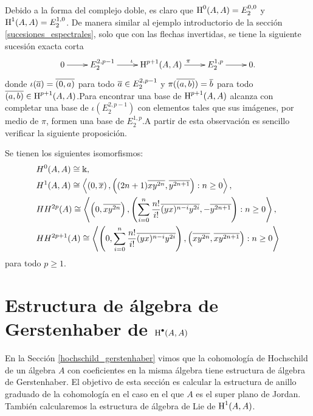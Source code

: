 \documentclass[fleqn,../tesis.tex]{subfiles}
\begin{document}
Debido a la forma del complejo doble, es claro que $\operatorname{H}^{0}(A, A) = E^{0, 0}_{2}$ y $\operatorname{H}^{1}(A, A) = E^{1, 0}_{2}$. De manera
similar al ejemplo introductorio de la sección \ref{sucesiones_espectrales}, solo que con las flechas invertidas, se tiene la siguiente
sucesión exacta corta
\begin{align*}
\xymatrix{
    0 \ar[r] & E^{2, p - 1}_{2} \ar[r]^{\iota} & \Hy^{p + 1}(A, A) \ar[r]^{\pi} & E^{1, p}_2 \ar[r] & 0.
}
\end{align*}
donde $\iota(\overline{a}) = \overline{(0, a)}$ para todo $\overline{a} \in E^{2, p - 1}_{2}$ y $\pi(\overline{(a, b)}) = \overline{b}$ para todo
$\overline{(a, b)} \in \operatorname{H}^{p + 1}(A, A)$.Para encontrar una
base de $\operatorname{H}^{p + 1}(A, A)$ alcanza con completar una base de $\iota\left(E^{2, p - 1}_{2}\right)$ con elementos
tales que sus imágenes, por medio de $\pi$, formen una base de $E^{1, p}_{2}$.A partir
de esta observación es sencillo verificar la siguiente proposición.
\begin{prop}
    Se tienen los siguientes isomorfismos:
    \begin{align*}
        &H^0(A,A) \cong \Bbbk, \\
  		&H^1(A,A) \cong \left\langle \left(0, \overline{x}\right), \left((2n + 1)\overline{xy^{2n}}, \overline{y^{2n + 1}}\right): n \geq 0\right\rangle, \\
  		&HH^{2p}(A) \cong \left\langle \left(0, \overline{xy^{2n}}\right),
  			\left(\sum_{i = 0}^n\frac{n!}{i!}\overline{(yx)^{n - i}y^{2i}}, -\overline{y^{2n + 1}} \right): n \geq 0\right\rangle,\\
  		&HH^{2p + 1}(A) \cong \left\langle \left(0, \sum_{i = 0}^n\frac{n!}{i!}\overline{(yx)^{n - i}y^{2i}}\right),
  			\left(\overline{xy^{2n}}, \overline{xy^{2n + 1}}\right) : n \geq 0\right\rangle 
    \end{align*}
    para todo $p\geq 1$.
\end{prop}

\section{Estructura de álgebra de Gerstenhaber de $\operatorname{H}^{\bullet}(A, A)$}
En la Sección \ref{hochschild_gerstenhaber} vimos que la cohomología de Hochschild de un álgebra $A$ con
coeficientes en la misma álgebra tiene estructura de álgebra de Gerstenhaber. El objetivo de esta
sección es calcular la estructura de anillo graduado de la cohomología en el caso en el que $A$ es el 
super plano de Jordan. También calcularemos la estructura de álgebra de Lie de $\operatorname{H}^{1}(A, A)$.
\end{document}
